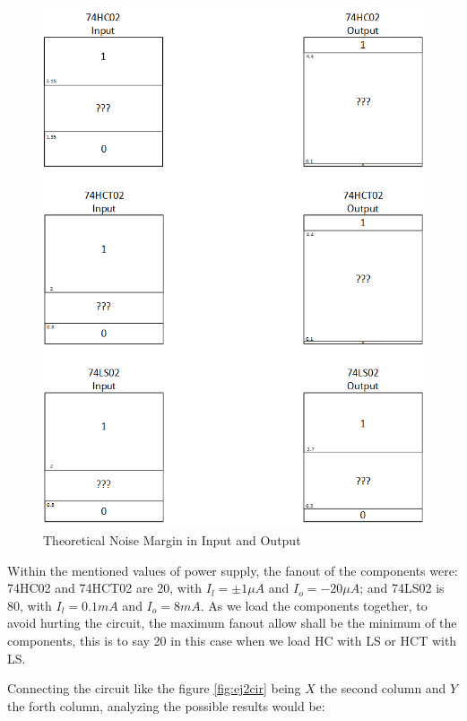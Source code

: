 	 \begin{figure}[h!]
        \centering
        \includegraphics[scale=0.5]{dataaa2.png}
        \caption{\color{cyan}Theoretical Noise Margin in Input and Output}
        \label{fig:ej2thnm}
    \end{figure}
    
    Within the mentioned values of power supply, the fanout of the components were: 74HC02 and 74HCT02 are 20, with $I_l =\pm1{\mu}A$ and $I_o=-20{\mu}A$; and 74LS02 is 80, with $I_l =0.1mA$ and $I_o=8mA$. As we load the components together, to avoid hurting the circuit, the maximum fanout allow shall be the minimum of the components, this is to say 20 in this case when we load HC with LS or HCT with LS. 
    
    Connecting the circuit like the figure \ref{fig:ej2cir} being $X$ the second column and $Y$ the forth column, analyzing the possible results would be:

